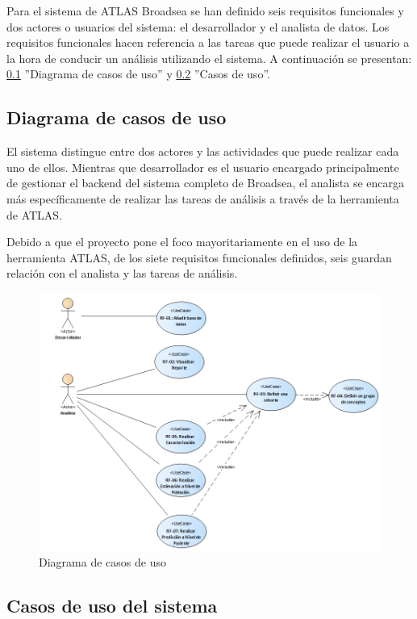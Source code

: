 Para el sistema de ATLAS Broadsea se han definido seis requisitos funcionales y dos actores o usuarios del sistema: el desarrollador y el analista de datos. Los requisitos funcionales hacen referencia a las tareas que puede realizar el usuario a la hora de conducir un análisis utilizando el sistema. A continuación se presentan: \ref{subsec:06FRdiagrama} ''Diagrama de casos de uso'' y \ref{subsec:06casosUso} ''Casos de uso''.

\subsection{Diagrama de casos de uso} \label{subsec:06FRdiagrama}

El sistema distingue entre dos actores y las actividades que puede realizar cada uno de ellos. Mientras que desarrollador es el usuario encargado principalmente de gestionar el backend del sistema completo de Broadsea, el analista se encarga más específicamente de realizar las tareas de análisis a través de la herramienta de ATLAS. 

Debido a que el proyecto pone el foco mayoritariamente en el uso de la herramienta ATLAS, de los siete requisitos funcionales definidos, seis guardan relación con el analista y las tareas de análisis.


\begin{figure}[H]
    \centering
    \includegraphics[width=1\textwidth]{figures/casosUso.png}
    \caption{Diagrama de casos de uso}
    \label{fig:casosUso}
\end{figure}

\subsection{Casos de uso del sistema} \label{subsec:06casosUso}

